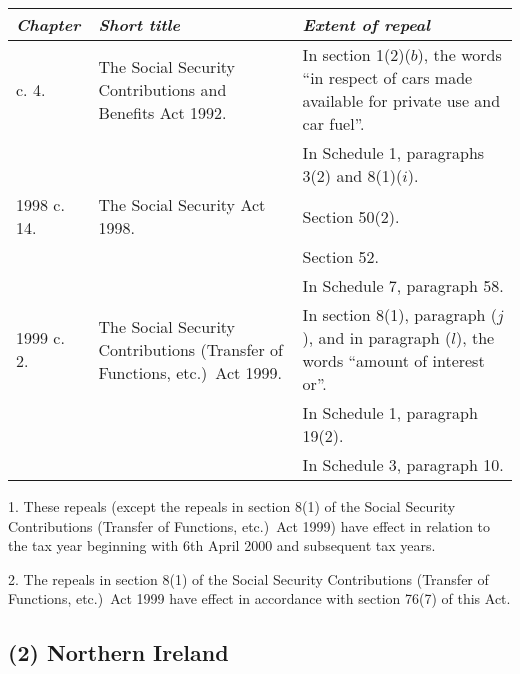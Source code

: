 \documentclass[12pt,a4paper]{article}
\begin{document}
{\footnotesize
\begin{longtable}{p{45.96pt}p{134.92946pt}p{173.11526pt}}
\hline
\itshape Chapter	&\itshape Short title	&\itshape Extent of repeal\\
\hline
\endhead
\hline
\endlastfoot
1992 c. 4. &	The Social Security Contributions and Benefits Act 1992. 	&In section 1(2)($b$), the words “in respect of cars made available for private use and car fuel”.\\
&		&In Schedule 1, paragraphs 3(2)  and 8(1)($i$).\\
1998 c. 14. 	&The Social Security Act 1998. 	&Section 50(2).\\
&&		Section 52. \\
&&		In Schedule 7, paragraph 58. \\
1999 c. 2. 	&The Social Security Contributions (Transfer of Functions, etc.)\ Act 1999. 	&In section 8(1), paragraph ($j$), and in paragraph ($l$), the words “amount of interest or”.\\
&&		In Schedule 1, paragraph 19(2).\\
	&&	In Schedule 3, paragraph 10. \\
\end{longtable}

}

1. 
These repeals (except the repeals in section 8(1)  of the Social Security Contributions (Transfer of Functions, etc.)\ Act 1999) have effect in relation to the tax year beginning with 6th April 2000 and subsequent tax years.

2. 
The repeals in section 8(1)  of the Social Security Contributions (Transfer of Functions, etc.)\ Act 1999 have effect in accordance with section 76(7)  of this Act.

\pagebreak[3]

\subsection*{
(2) 
Northern Ireland}
\end{document}

